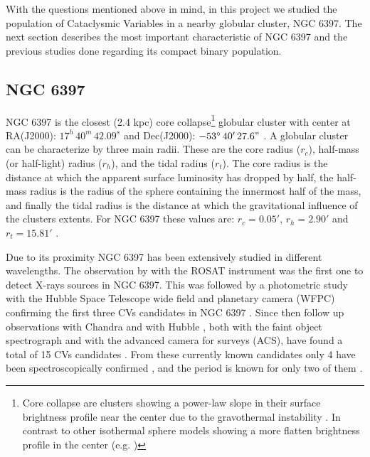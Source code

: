 With the questions mentioned above in mind, in this project we studied the population of Cataclysmic Variables in a nearby globular cluster, NGC 6397. The next section describes the most important characteristic of NGC 6397 and the previous studies done regarding its compact binary population. 



\subsection{NGC 6397}
NGC 6397 is the closest (2.4 kpc) core collapse\footnote{Core collapse are clusters showing a power-law slope in their surface brightness profile near the center due to the gravothermal instability \citep{antonov_solution_1962,lynden-bell_gravo-thermal_1968,lynden-bell_consequences_1980}. In contrast to other isothermal sphere models showing a more flatten brightness profile in the center (e.g. \citealp{king_structure_1966})} globular cluster \citep{harris_catalog_1996,mclaughlin_resolved_2005} with center at RA(J2000): $17^h \, 40^m \, 42.09^s$  and Dec(J2000): $-53^\circ \, 40'\, 27.6"$ \citep{harris_catalog_1996}. A globular cluster can be characterize by three main radii. These are the core radius ($r_c$), half-mass (or half-light) radius ($r_h$), and the tidal radius ($r_t$). The core radius is the distance at which the apparent surface luminosity has dropped by half, the half-mass radius is the radius of the sphere containing the innermost half of the mass, and finally the tidal radius is the distance at which the gravitational influence of the clusters extents. For NGC 6397 these values are: $r_c=0.05'$, $r_h=2.90'$ and $r_t = 15.81'$ \citep{harris_catalog_1996}. 

Due to its proximity NGC 6397 has been extensively studied in different  wavelengths. The observation by \cite{cool_discovery_1993} with the ROSAT instrument was the first one to detect X-rays sources in NGC 6397. This was followed by a photometric study with the Hubble Space Telescope wide field and planetary camera (WFPC) confirming the first three CVs candidates in NGC 6397 \citep{cool_discovery_1995}. Since then follow up observations with Chandra \citep{grindlay_chandra_2001,bogdanov_chandra_2010} and with Hubble \citep{taylor_helium_2001,grindlay_compact_2006}, both with the faint object spectrograph and with the advanced camera for surveys (ACS), have found a total of 15 CVs candidates \citep{cohn_identification_2010}. From these currently known candidates only 4 have been spectroscopically confirmed \citep{grindlay_spectroscopic_1995,edmonds_cataclysmic_1999}, and the period is known for only two of them \citep{kaluzny_time_2003,kaluzny_photometric_2006}. 

